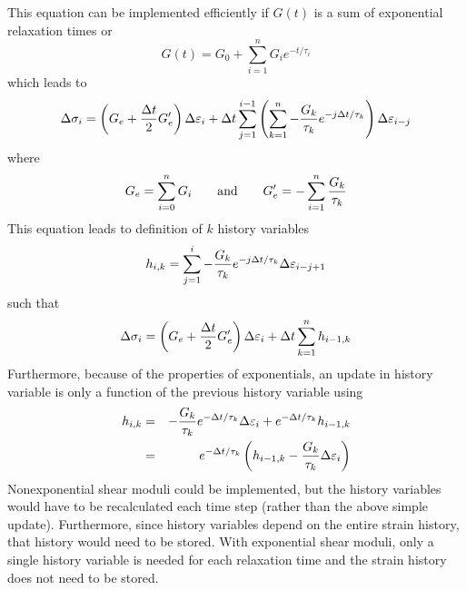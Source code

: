 \documentclass[11pt]{article}
\def\e#1{\varepsilon_{#1}}
\def\s#1{\sigma_{#1}}
\begin{document}
This equation can be implemented efficiently if $G(t)$ is a sum of exponential relaxation times or
\begin{equation}
        G(t) = G_0 + \sum_{i=1}^n G_i e^{-t/\tau_i}
\end{equation}
which leads to
\begin{equation}
    \Delta \s{i} = \left(G_e + {\Delta t\over 2}G_e'\right)\Delta \e{i} 
                          + \Delta t \sum_{j=1}^{i-1}
                            \left(\sum_{k=1}^n -{G_k\over\tau_k} e^{-j\Delta t/\tau_k}\right)\Delta \e{i-j}
\end{equation}
where
\begin{equation}
            G_e = \sum_{i=0}^n G_i     \qquad {\rm and} \qquad     G_e' = -\sum_{i=1}^n {G_k\over\tau_k}
\end{equation}
This equation leads to definition of $k$ history variables
\begin{equation}
      h_{i,k} = \sum_{j=1}^{i}  -{G_k\over\tau_k} e^{-j\Delta t/\tau_k}\Delta \e{i-j+1}
\end{equation}
such that
\begin{equation}
    \Delta \s{i} = \left(G_e + {\Delta t\over 2}G_e'\right)\Delta \e{i} 
                          + \Delta t  \sum_{k=1}^n h_{i-1,k}
\end{equation}
Furthermore, because of the properties of exponentials, an update in history variable is only a function of the previous history variable using
\begin{eqnarray}
        h_{i,k} & = & -{G_k\over\tau_k} e^{-\Delta t/\tau_k}\Delta \e{i} + e^{-\Delta t/\tau_k}h_{i-1,k}  \\
           & = & e^{-\Delta t/\tau_k}\left(h_{i-1,k} - {G_k\over\tau_k}\Delta \e{i}\right)
\end{eqnarray}
Nonexponential shear moduli could be implemented, but the history variables would have to be recalculated each time step (rather than the above simple update). Furthermore, since history variables depend on the entire strain history, that history would need to be stored. With exponential shear moduli, only a single history variable is needed for each relaxation time and the strain history does not need to be stored.
\end{document}
